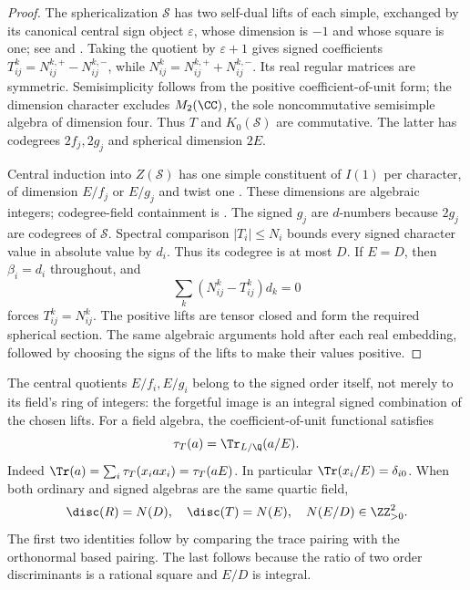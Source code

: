 \begin{proof}
The sphericalization $\mathcal S$ has two self-dual lifts of each
simple, exchanged by its canonical central sign object $\varepsilon$,
whose dimension is $-1$ and whose square is one; see
\cite[Section~5.3]{Bartlett} and \cite[Section~5.1]{Ostrik3}.
Taking the quotient by $\varepsilon+1$ gives signed coefficients
$T_{ij}^k=N_{ij}^{k,+}-N_{ij}^{k,-}$, while
$N_{ij}^k=N_{ij}^{k,+}+N_{ij}^{k,-}$. Its real regular matrices
are symmetric. Semisimplicity follows from the positive
coefficient-of-unit form; the dimension character excludes
$M_2(\CC)$, the sole noncommutative semisimple algebra of
dimension four. Thus $T$ and $K_0(\mathcal S)$ are commutative.
The latter has codegrees $2f_j,2g_j$ and spherical dimension $2E$.

Central induction into $Z(\mathcal S)$ has one simple constituent
of $I(1)$ per character, of dimension $E/f_j$ or $E/g_j$ and twist
one \cite[Theorems~2.5 and~2.13]{Ostrik3}. These dimensions are
algebraic integers; codegree-field containment is
\cite[Corollary~2.15]{Ostrik3}. The signed $g_j$ are $d$-numbers
because $2g_j$ are codegrees of $\mathcal S$.
Spectral comparison $|T_i|\le N_i$ bounds every signed character
value in absolute value by $d_i$. Thus its codegree is at most $D$.
If $E=D$, then $\beta_i=d_i$ throughout, and
\[
 \sum_k(N_{ij}^k-T_{ij}^k)d_k=0
\]
forces $T_{ij}^k=N_{ij}^k$. The positive lifts are tensor closed
and form the required spherical section. The same algebraic
arguments hold after each real embedding, followed by choosing
the signs of the lifts to make their values positive.
\end{proof}

The central quotients $E/f_i,E/g_i$ belong to the signed order itself,
not merely to its field's ring of integers: the forgetful image is an
integral signed combination of the chosen lifts.
For a field algebra, the coefficient-of-unit functional satisfies
\begin{equation}\label{core:frobenius-trace}
\tau_T(a)=\Tr_{L/\Q}(a/E).
\end{equation}
Indeed $\Tr(a)=\sum_i\tau_T(x_i a x_i)=\tau_T(aE)$.
In particular $\Tr(x_i/E)=\delta_{i0}$.
When both ordinary and signed algebras are the same quartic field,
\begin{equation}\label{core:discriminants}
\disc(R)=N(D),\quad \disc(T)=N(E),\quad N(E/D)\in\ZZ_{>0}^2.
\end{equation}
The first two identities follow by comparing the trace pairing with
the orthonormal based pairing. The last follows because the ratio
of two order discriminants is a rational square and $E/D$ is integral.

